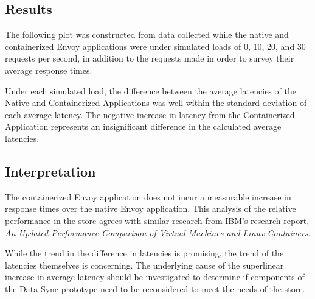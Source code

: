 \documentclass{article}
\begin{document}
\subsection{Results}
The following plot was constructed from data collected while the native and containerized Envoy applications were under simulated loads of 0, 10, 20, and 30 requests per second, in addition to the requests made in order to survey their average response times.


Under each simulated load, the difference between the average latencies of the Native and Containerized Applications was well within the standard deviation of each average latency. The negative increase in latency from the Containerized Application represents an insignificant difference in the calculated average latencies.

\subsection{Interpretation}
The containerized Envoy application does not incur a measurable increase in response times over the native Envoy application. This analysis of the relative performance in the store agrees with similar research from IBM's research report, \href{https://dominoweb.draco.res.ibm.com/reports/rc25482.pdf}{\textit{An Updated Performance Comparison of Virtual Machines and Linux Containers}}.

While the trend in the difference in latencies is promising, the trend of the latencies themselves is concerning. The underlying cause of the superlinear increase in average latency should be investigated to determine if components of the Data Sync prototype need to be reconsidered to meet the needs of the store.
\end{document}
